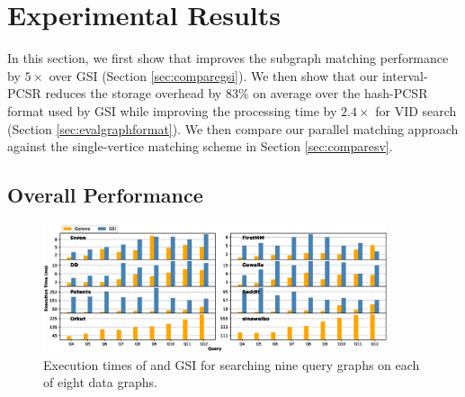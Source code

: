 \section{Experimental Results}
In this section, we first show that \SystemName improves the subgraph matching performance by $5\times$ over GSI (Section \ref{sec:comparegsi}). We
then show that our interval-PCSR reduces the storage overhead by 83\% on average over the hash-PCSR format used by GSI while improving the
processing time by $2.4\times$ for VID search (Section \ref{sec:evalgraphformat}). We then compare our parallel matching approach against the
single-vertice matching scheme in Section \ref{sec:comparesv}.


\subsection{Overall Performance\label{sec:comparegsi}}
\begin{figure}
\centering
\includegraphics[width=0.9\textwidth]{./figure/overperformance.eps}
\caption{Execution times of \SystemName and GSI for searching nine query graphs on each of eight data graphs.}	
\label{fig:overallperf}
\end{figure}

